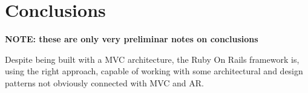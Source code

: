 \chapter{Conclusions}\label{chap:conclusions}

\textbf{NOTE: these are only very preliminar notes on conclusions}

Despite being built with a MVC architecture, the Ruby On Rails framework is, using the right approach, capable of working with some architectural and design patterns not obviously connected with MVC and AR.


